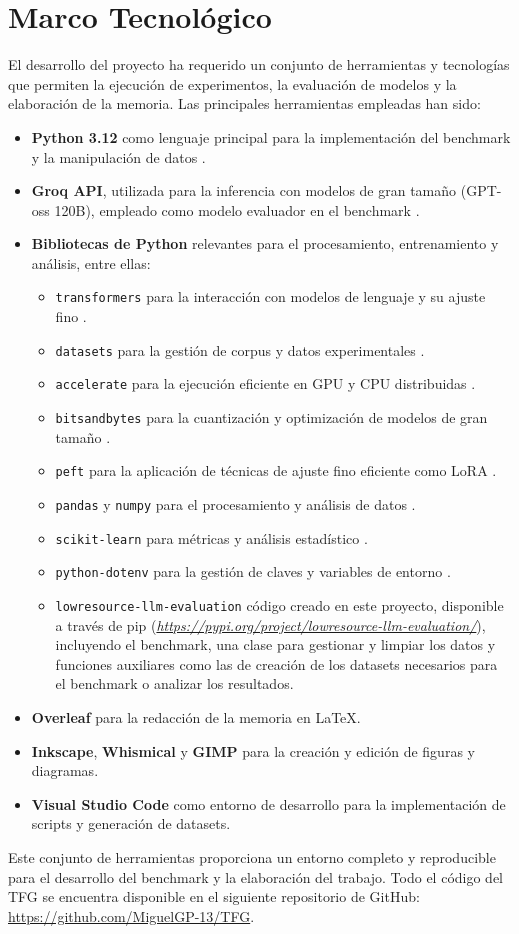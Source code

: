 \section{Marco Tecnológico}

El desarrollo del proyecto ha requerido un conjunto de herramientas y tecnologías que permiten la ejecución de experimentos, la evaluación de modelos y la elaboración de la memoria. Las principales herramientas empleadas han sido:

\begin{itemize}
    \item \textbf{Python 3.12} como lenguaje principal para la implementación del benchmark y la manipulación de datos \cite{python}.
    \item \textbf{Groq API}, utilizada para la inferencia con modelos de gran tamaño (GPT-oss 120B), empleado como modelo evaluador en el benchmark \cite{groqapi}.
    \item \textbf{Bibliotecas de Python} relevantes para el procesamiento, entrenamiento y análisis, entre ellas:
    \begin{itemize}
        \item \texttt{transformers} para la interacción con modelos de lenguaje y su ajuste fino \cite{wolf2020transformers}.
        \item \texttt{datasets} para la gestión de corpus y datos experimentales \cite{lhoest2021datasets}.
        \item \texttt{accelerate} para la ejecución eficiente en GPU y CPU distribuidas \cite{accelerate}.
        \item \texttt{bitsandbytes} para la cuantización y optimización de modelos de gran tamaño \cite{bitsandbytes}.
        \item \texttt{peft} para la aplicación de técnicas de ajuste fino eficiente como LoRA \cite{peft}.
        \item \texttt{pandas} y \texttt{numpy} para el procesamiento y análisis de datos \cite{pandas,numpy}.
        \item \texttt{scikit-learn} para métricas y análisis estadístico \cite{scikit-learn}.
        \item \texttt{python-dotenv} para la gestión de claves y variables de entorno \cite{python-dotenv}.
        \item \texttt{lowresource-llm-evaluation} código creado en este proyecto, disponible a través de pip (\textit{\url{https://pypi.org/project/lowresource-llm-evaluation/}}), incluyendo el benchmark, una clase para gestionar y limpiar los datos y funciones auxiliares como las de creación de los datasets necesarios para el benchmark o analizar los resultados.
    \end{itemize}
    \item \textbf{Overleaf} para la redacción de la memoria en \LaTeX.
    \item \textbf{Inkscape}, \textbf{Whismical} y \textbf{GIMP} para la creación y edición de figuras y diagramas.
    \item \textbf{Visual Studio Code} como entorno de desarrollo para la implementación de scripts y generación de datasets.
\end{itemize}

Este conjunto de herramientas proporciona un entorno completo y reproducible para el desarrollo del benchmark y la elaboración del trabajo. Todo el código del TFG se encuentra disponible en el siguiente repositorio de GitHub: \url{https://github.com/MiguelGP-13/TFG}.
